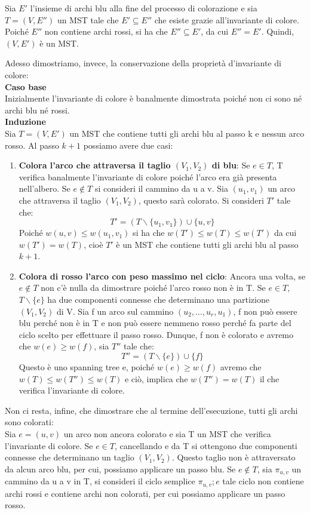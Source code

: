 Sia $E'$ l'insieme di archi blu alla fine del processo di colorazione e sia $T=(V,E'')$ un MST tale che $E' \subseteq E''$ che esiste grazie all'invariante di colore. Poiché $E''$ non contiene archi rossi, si ha che $E'' \subseteq E'$, da cui $E'' = E'$. Quindi, $(V,E')$ è un MST.

Adesso dimostriamo, invece, la conservazione della proprietà d'invariante di colore:\\
\textbf{Caso base}\\
Inizialmente l'invariante di colore è banalmente dimostrata poiché non ci sono né archi blu né rossi.\\
\textbf{Induzione}\\
Sia $T=(V,E')$ un MST che contiene tutti gli archi blu al passo k e nessun arco rosso. Al passo $k+1$ possiamo avere due casi:
\begin{enumerate}
    \item \textbf{Colora l'arco che attraversa il taglio $(V_1,V_2)$ di blu}: Se $ e \in T$, T verifica banalmente l'invariante di colore poiché l'arco era già presenta nell'albero. Se $e \notin T$ si consideri il cammino da u a v. Sia $(u_1,v_1)$ un arco che attraversa il taglio $(V_1,V_2)$, questo sarà colorato. Si consideri $T'$ tale che:
    \[T' = (T \backslash \{u_1,v_1\}) \cup \{u,v\} \] 
    Poiché $w(u, v) \leq w(u_1,v_1)$ si ha che $w(T')\leq w(T) \leq w(T')$ da cui $w(T')=w(T)$, cioè $T'$ è un MST che contiene tutti gli archi blu al passo $k+1$.
    \item \textbf{Colora di rosso l'arco con peso massimo nel ciclo}: Ancora una volta, se $e \notin T$ non c'è nulla da dimostrare poiché l'arco rosso non è in T. Se $e \in T$, $T \backslash \{e\}$ ha due componenti connesse che determinano una partizione $(V_1,V_2)$ di V. Sia f un arco sul cammino $(u_2,\dots ,u_r,u_1 )$, f non può essere blu perché non è in T e non può essere nemmeno rosso perché fa parte del ciclo scelto per effettuare il passo rosso. Dunque, f non è colorato e avremo che $w(e)\geq w(f)$, sia $T''$ tale che:
    \[T'' = (T \backslash \{e\}) \cup \{f\}\]
    Questo è uno spanning tree e, poiché $w(e) \geq w(f)$ avremo che $w(T) \leq w(T'') \leq w(T)$ e ciò, implica che $w(T'')=w(T)$ il che verifica l'invariante di colore.
\end{enumerate}

Non ci resta, infine, che dimostrare che al termine dell'esecuzione, tutti gli archi sono colorati:\\
Sia $e=(u,v)$ un arco non ancora colorato e sia T un MST che verifica l'invariante di colore. Se $e\in T$, cancellando e da T si ottengono due componenti connesse che determinano un taglio $(V_1,V_2)$. Questo taglio non è attraversato da alcun arco blu, per cui, possiamo applicare un passo blu. Se $ e \notin T$, sia $\pi_{u,v}$ un cammino da u a v in T, si consideri il ciclo semplice $\pi_{u,v};e$ tale ciclo non contiene archi rossi e contiene archi non colorati, per cui possiamo applicare un passo rosso.

